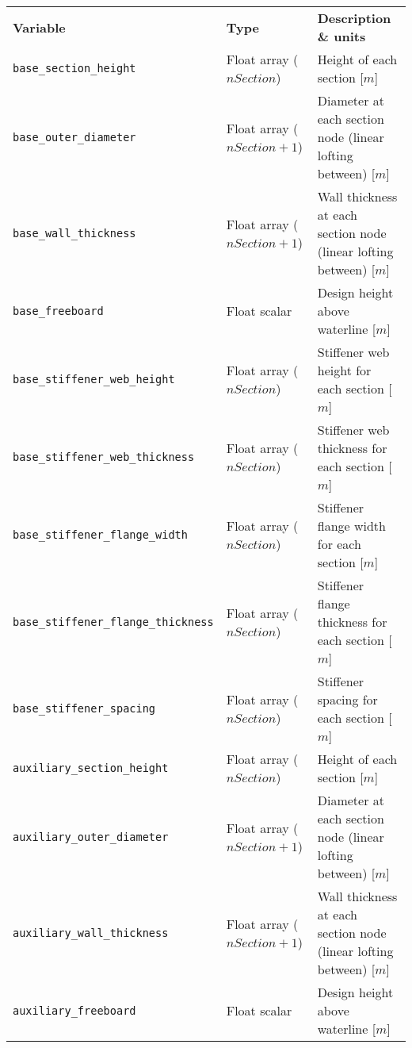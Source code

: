 {\footnotesize
  \begin{tabularx}{\linewidth}{ l l X }
    \textbf{Variable} & \textbf{Type} & \textbf{Description \& units} \\
    \texttt{base\_section\_height} & Float array ($nSection$) & Height of each section [$m$]\\
    \texttt{base\_outer\_diameter} & Float array ($nSection+1$) & Diameter at each section node (linear lofting between) [$m$] \\
    \texttt{base\_wall\_thickness} & Float array ($nSection+1$) & Wall thickness at each section node (linear lofting between) [$m$] \\
    \texttt{base\_freeboard} & Float scalar & Design height above waterline [$m$]\\

    \texttt{base\_stiffener\_web\_height} & Float array ($nSection$) & Stiffener web height for each section [$m$]\\
    \texttt{base\_stiffener\_web\_thickness} & Float array ($nSection$) & Stiffener web thickness for each section [$m$]\\
    \texttt{base\_stiffener\_flange\_width} & Float array ($nSection$) & Stiffener flange width for each section [$m$]\\
    \texttt{base\_stiffener\_flange\_thickness} & Float array ($nSection$) & Stiffener flange thickness for each section [$m$]\\
    \texttt{base\_stiffener\_spacing} & Float array ($nSection$) &
    Stiffener spacing for each section [$m$]\\
    
    \texttt{auxiliary\_section\_height} & Float array ($nSection$) & Height of each section [$m$]\\
    \texttt{auxiliary\_outer\_diameter} & Float array ($nSection+1$) & Diameter at each section node (linear lofting between) [$m$] \\
    \texttt{auxiliary\_wall\_thickness} & Float array ($nSection+1$) & Wall thickness at each section node (linear lofting between) [$m$] \\
    \texttt{auxiliary\_freeboard} & Float scalar & Design height above waterline [$m$]\\


\end{tabularx}}
